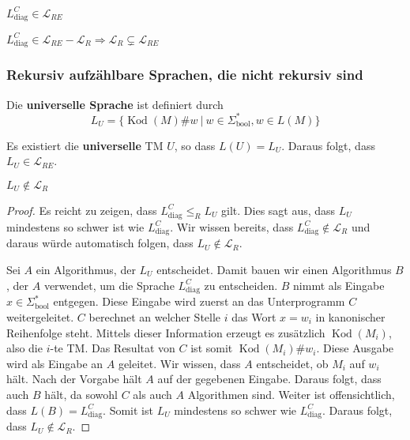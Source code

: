 \begin{lemma}
\( L_\text{diag}^C \in \mathcal{L}_{RE} \)\\
\end{lemma}

\begin{corollary}
\( L_\text{diag}^C \in \mathcal{L}_{RE} - \mathcal{L}_R \Rightarrow \mathcal{L}_R \subsetneq \mathcal{L}_{RE} \)
\end{corollary}

\subsubsection{Rekursiv aufzählbare Sprachen, die nicht rekursiv sind}

\begin{definition}
Die \textbf{universelle Sprache} ist definiert durch \[ L_U = \{ \operatorname{Kod}(M)\#w \ |\ w \in \Sigma_\text{bool}^*, w \in L(M) \} \]
\end{definition}

\begin{satz}
Es existiert die \textbf{universelle} TM \( U \), so dass \( L(U) = L_U \). Daraus folgt, dass \( L_U \in \mathcal{L}_{RE} \).\\
\end{satz}

\begin{satz}
\( L_U \notin \mathcal{L}_R \)
\end{satz}

\begin{proof}
Es reicht zu zeigen, dass \( L_\text{diag}^C \leq_R L_U \) gilt. Dies sagt aus, dass \( L_U \) mindestens so schwer ist wie \( L_\text{diag}^C \). Wir wissen bereits, dass \( L_\text{diag}^C \notin \mathcal{L}_R \) und daraus würde automatisch folgen, dass \( L_U \notin \mathcal{L}_R \).

Sei \( A \) ein Algorithmus, der \( L_U \) entscheidet. Damit bauen wir einen Algorithmus \( B \), der \( A \) verwendet, um die Sprache \( L_\text{diag}^C \) zu entscheiden. \( B \) nimmt als Eingabe \( x \in \Sigma_\text{bool}^* \) entgegen. Diese Eingabe wird zuerst an das Unterprogramm \( C \) weitergeleitet. \( C \) berechnet an welcher Stelle \( i \) das Wort \( x = w_i \) in kanonischer Reihenfolge steht. Mittels dieser Information erzeugt es zusätzlich \( \operatorname{Kod}(M_i) \), also die \( i \)-te TM. Das Resultat von \( C \) ist somit \(\operatorname{Kod}(M_i)\#w_i\). Diese Ausgabe wird als Eingabe an \( A \) geleitet. Wir wissen, dass \( A \) entscheidet, ob \( M_i \) auf \( w_i \) hält. Nach der Vorgabe hält \( A \) auf der gegebenen Eingabe. Daraus folgt, dass auch \( B \) hält, da sowohl \( C \) als auch \( A \) Algorithmen sind. Weiter ist offensichtlich, dass \( L(B) = L_\text{diag}^C \). Somit ist \( L_U \) mindestens so schwer wie \( L_\text{diag}^C \). Daraus folgt, dass \( L_U \notin \mathcal{L}_R \).
\end{proof}

